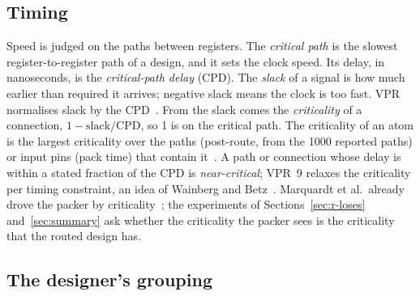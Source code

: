 \subsection{Timing}

Speed is judged on the paths between registers. The \emph{critical path} is the slowest register-to-register path of a design, and it sets the clock speed. %
Its delay, in nanoseconds, is the \emph{critical-path delay} (CPD). %
The \emph{slack} of a signal is how much earlier than required it arrives; negative slack means the clock is too fast. VPR normalises slack by the CPD~\cite{luu2014thesis}. %
From the slack comes the \emph{criticality} of a connection, $1-\text{slack}/\text{CPD}$, so 1 is on the critical path. The criticality of an atom is the largest criticality over the paths (post-route, from the 1000 reported paths) or input pins (pack time) that contain it~\cite{luu2014thesis}. %
A path or connection whose delay is within a stated fraction of the CPD is \emph{near-critical}; VPR~9 relaxes the criticality per timing constraint, an idea of Wainberg and Betz~\cite{wainberg2015relaxed}. %
Marquardt et al.\ already drove the packer by criticality~\cite{marquardt99cluster}; the experiments of Sections~\ref{sec:r-loses} and~\ref{sec:summary} ask whether the criticality the packer sees is the criticality that the routed design has.

\subsection{The designer's grouping}


